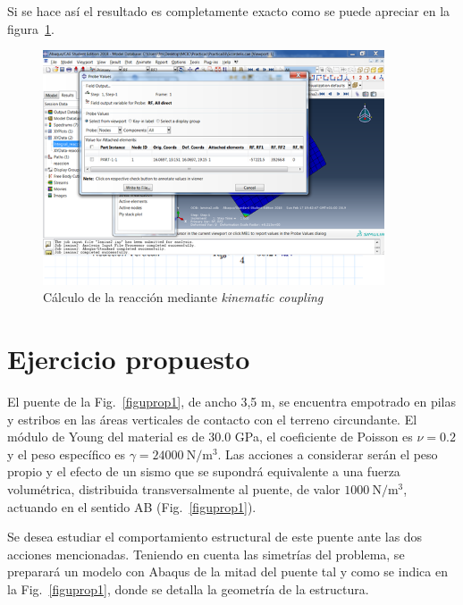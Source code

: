 \documentclass[spanish,a4paper,12pt]{article}
\begin{document}
Si se hace así el resultado es completamente exacto como se puede apreciar en la figura~\ref{fig:calc-reak-kinem}.
\begin{figure}[!htp]
\centering
\includegraphics[width=0.9\textwidth]{fm/Fig-9_Kinematic_Reacc_Vertical.png}
\caption{Cálculo de la reacción mediante \emph{kinematic coupling}}
\label{fig:calc-reak-kinem}
\end{figure}
{}
\mbox{}

\clearpage
\section{Ejercicio propuesto}
El puente de la Fig.~\ref{figuprop1}, de ancho 3,5 m, se encuentra empotrado en pilas y estribos en las áreas verticales de contacto con el terreno circundante. El módulo de Young del material es de 30.0 GPa, el coeficiente de Poisson es $\nu=0.2$ y el peso específico es $\gamma=24000 \mathrm{~N} / \mathrm{m}^{3}$. Las acciones a considerar serán el peso propio y el efecto de un sismo que se supondrá equivalente a una fuerza volumétrica, distribuida transversalmente al puente, de valor $1000 \mathrm{~N} / \mathrm{m}^{3}$, actuando en el sentido AB (Fig.~\ref{figuprop1}).

Se desea estudiar el comportamiento estructural de este puente ante las dos acciones mencionadas. Teniendo en cuenta las simetrías del problema, se preparará un modelo con Abaqus de la mitad del puente tal y como se indica en la Fig.~\ref{figuprop1}, donde se detalla la geometría de la estructura.
\end{document}
